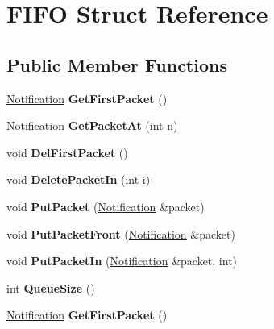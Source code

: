 \hypertarget{structFIFO}{}\section{F\+I\+FO Struct Reference}
\label{structFIFO}
\subsection*{Public Member Functions}
\begin{DoxyCompactItemize}
\item 
\mbox{\label{structFIFO_a0158dc906ce294fce5e0b00ade2bdf65}} 
\hyperlink{structNotification}{Notification} {\bfseries Get\+First\+Packet} ()
\item 
\mbox{\label{structFIFO_a4d2f64e8642a1e06a1e3e2501e800e27}} 
\hyperlink{structNotification}{Notification} {\bfseries Get\+Packet\+At} (int n)
\item 
\mbox{\label{structFIFO_acb3779ce28727cbe31c470d4aa2750de}} 
void {\bfseries Del\+First\+Packet} ()
\item 
\mbox{\label{structFIFO_aac6e353d21c13159cf0b96e739c24139}} 
void {\bfseries Delete\+Packet\+In} (int i)
\item 
\mbox{\label{structFIFO_a3aecc7b5584eb3160d1e6a3d9b6c3998}} 
void {\bfseries Put\+Packet} (\hyperlink{structNotification}{Notification} \&packet)
\item 
\mbox{\label{structFIFO_ade1f262e3c104b2d7b537d8edf6cb5ae}} 
void {\bfseries Put\+Packet\+Front} (\hyperlink{structNotification}{Notification} \&packet)
\item 
\mbox{\label{structFIFO_af5cee3f058378244a1ea0e51e1011f60}} 
void {\bfseries Put\+Packet\+In} (\hyperlink{structNotification}{Notification} \&packet, int)
\item 
\mbox{\label{structFIFO_a9f792cca246856881b4b6f2c9672d388}} 
int {\bfseries Queue\+Size} ()
\item 
\mbox{\label{structFIFO_a0158dc906ce294fce5e0b00ade2bdf65}} 
\hyperlink{structNotification}{Notification} {\bfseries Get\+First\+Packet} ()

\end{DoxyCompactItemize}
